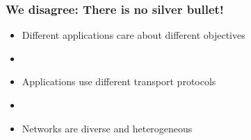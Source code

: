 \begin{frame}[plain]
\frametitle{We disagree: There is no silver bullet!}
\begin{itemize}
\item{Different applications care about different objectives}

\item[]

\item{Applications use different transport protocols}
\item[]

\item{Networks are diverse and heterogeneous}

\end{itemize}
\end{frame}

